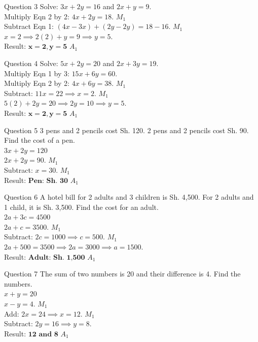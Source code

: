 \documentclass[12pt, a4paper, oneside]{article}
\begin{document}
\begin{solvingbox}{Question 3}
Solve: $3x + 2y = 16$ and $2x + y = 9$. \\
Multiply Eqn 2 by 2: $4x + 2y = 18$. \hfill $M_1$ \\
Subtract Eqn 1: $(4x-3x) + (2y-2y) = 18-16$. \hfill $M_1$ \\
$x = 2 \implies 2(2) + y = 9 \implies y = 5$. \\
Result: $\mathbf{x=2, y=5}$ \hfill $A_1$
\end{solvingbox}

\begin{solvingbox}{Question 4}
Solve: $5x + 2y = 20$ and $2x + 3y = 19$. \\
Multiply Eqn 1 by 3: $15x + 6y = 60$. \\
Multiply Eqn 2 by 2: $4x + 6y = 38$. \hfill $M_1$ \\
Subtract: $11x = 22 \implies x = 2$. \hfill $M_1$ \\
$5(2) + 2y = 20 \implies 2y = 10 \implies y = 5$. \\
Result: $\mathbf{x=2, y=5}$ \hfill $A_1$
\end{solvingbox}

\begin{solvingbox}{Question 5}
3 pens and 2 pencils cost Sh. 120. 2 pens and 2 pencils cost Sh. 90. Find the cost of a pen. \\
$3x + 2y = 120$ \\
$2x + 2y = 90$. \hfill $M_1$ \\
Subtract: $x = 30$. \hfill $M_1$ \\
Result: $\mathbf{\text{Pen: Sh. 30}}$ \hfill $A_1$
\end{solvingbox}

\begin{solvingbox}{Question 6}
A hotel bill for 2 adults and 3 children is Sh. 4,500. For 2 adults and 1 child, it is Sh. 3,500. Find the cost for an adult. \\
$2a + 3c = 4500$ \\
$2a + c = 3500$. \hfill $M_1$ \\
Subtract: $2c = 1000 \implies c = 500$. \hfill $M_1$ \\
$2a + 500 = 3500 \implies 2a = 3000 \implies a = 1500$. \\
Result: $\mathbf{\text{Adult: Sh. 1,500}}$ \hfill $A_1$
\end{solvingbox}

\begin{solvingbox}{Question 7}
The sum of two numbers is 20 and their difference is 4. Find the numbers. \\
$x + y = 20$ \\
$x - y = 4$. \hfill $M_1$ \\
Add: $2x = 24 \implies x = 12$. \hfill $M_1$ \\
Subtract: $2y = 16 \implies y = 8$. \\
Result: $\mathbf{12 \text{ and } 8}$ \hfill $A_1$
\end{solvingbox}
\end{document}
